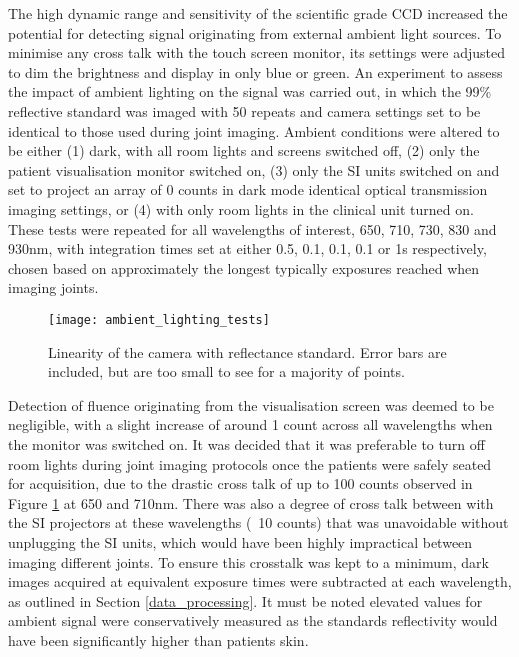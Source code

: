 \documentclass[twoside]{bhamthesis}
\theoremstyle{definition}
\begin{document}
The high dynamic range and sensitivity of the scientific grade CCD increased the potential for detecting signal originating from external ambient light sources. To minimise any cross talk with the touch screen monitor, its settings were adjusted to dim the brightness and display in only blue or green. An experiment to assess the impact of ambient lighting on the signal was carried out, in which the 99\% reflective standard was imaged with 50 repeats and camera settings set to be identical to those used during joint imaging. Ambient conditions were altered to be either (1) dark, with all room lights and screens switched off, (2) only the patient visualisation monitor switched on, (3) only the SI units switched on and set to project an array of 0 counts in dark mode identical optical transmission imaging settings, or (4) with only room lights in the clinical unit turned on. These tests were repeated for all wavelengths of interest, 650, 710, 730, 830 and 930nm, with integration times set at either 0.5, 0.1, 0.1, 0.1 or 1s respectively, chosen based on approximately the longest typically exposures reached when imaging joints.

\begin{figure}[!ht]
\centering
  \centering
  \texttt{[image: ambient\_lighting\_tests]}
\caption{Linearity of the camera with reflectance standard. Error bars are included, but are too small to see for a majority of points.}
  \label{fig:ambient_lighting_tests2}
\end{figure}

Detection of fluence originating from the visualisation screen was deemed to be negligible, with a slight increase of around 1 count across all wavelengths when the monitor was switched on. It was decided that it was preferable to turn off room lights during joint imaging protocols once the patients were safely seated for acquisition, due to the drastic cross talk of up to 100 counts observed in Figure \ref{fig:ambient_lighting_tests2} at 650 and 710nm. There was also a degree of cross talk between with the SI projectors at these wavelengths (~10 counts) that was unavoidable without unplugging the SI units, which would have been highly impractical between imaging different joints. To ensure this crosstalk was kept to a minimum, dark images acquired at equivalent exposure times were subtracted at each wavelength, as outlined in Section \ref{data_processing}. It must be noted elevated values for ambient signal were conservatively measured as the standards reflectivity would have been significantly higher than patients skin. 
\end{document}
